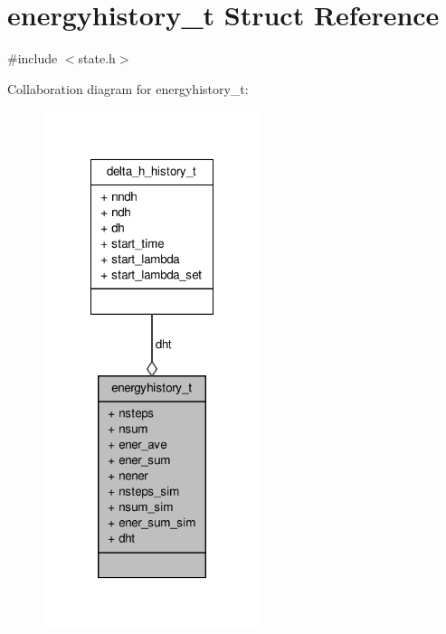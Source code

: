 \hypertarget{structenergyhistory__t}{\section{energyhistory\-\_\-t \-Struct \-Reference}
\label{structenergyhistory__t}
}


{\ttfamily \#include $<$state.\-h$>$}



\-Collaboration diagram for energyhistory\-\_\-t\-:
\nopagebreak
\begin{figure}[H]
\begin{center}
\leavevmode
\includegraphics[width=180pt]{structenergyhistory__t__coll__graph}
\end{center}
\end{figure}
